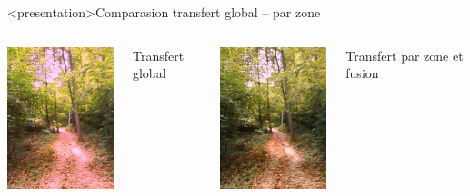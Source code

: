 \begin{frame}<presentation>{Comparasion transfert global -- par zone}
  \begin{columns}
    \column{6cm}
    \centering
    \includegraphics[width=4cm]{srcDSC00025tgtPB020097}

    Transfert global

    \column{6cm}
    \centering
    \includegraphics[width=4cm]{res}

    Transfert par zone et fusion
  \end{columns}
\end{frame}




\appendix


